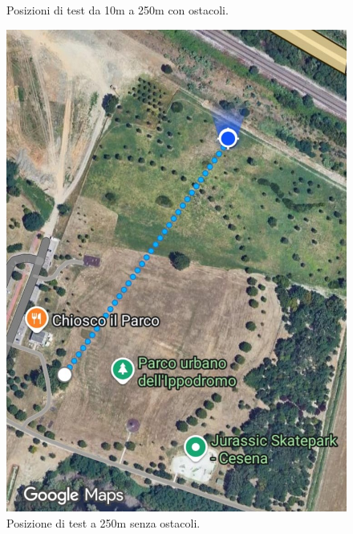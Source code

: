 \documentclass[12pt,a4paper,twoside]{book}
\begin{document}
\begin{figure}[H]
\begin{minipage}{0.32\textwidth}
        \caption{Posizioni di test da 10m a 250m con ostacoli.}
        \label{fig:throughput-test-10-250m-full}
    \end{minipage}
    \hfill
    \begin{minipage}{0.32\textwidth}
        \centering
        \includegraphics[width=\textwidth]{img/tests/T1/sat/10-250-direct.jpeg}
        \caption{Posizione di test a 250m senza ostacoli.}
        \label{fig:throughput-test-10-250m-direct}
    \end{minipage}
    \hfill
    \begin{minipage}{0.32\textwidth}
        \centering

\end{minipage}
\end{figure}
\end{document}
